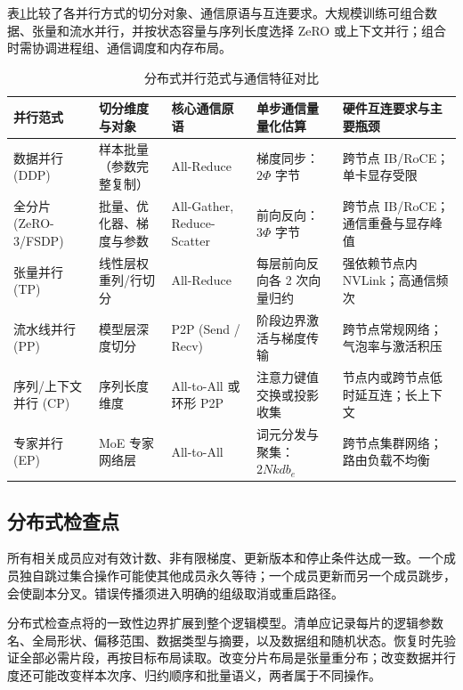 \documentclass[../textbook.tex]{subfiles}
\begin{document}
表\ref{tab:distributed-paradigms}比较了各并行方式的切分对象、通信原语与互连要求。大规模训练可组合数据、张量和流水并行，并按状态容量与序列长度选择 ZeRO 或上下文并行；组合时需协调进程组、通信调度和内存布局。

\begin{table}[htbp]
\centering
\caption{分布式并行范式与通信特征对比}\label{tab:distributed-paradigms}
\begin{tabularx}{\linewidth}{@{}lXXXX@{}}
\toprule
并行范式 & 切分维度与对象 & 核心通信原语 & 单步通信量量化估算 & 硬件互连要求与主要瓶颈 \\
\midrule
数据并行 (DDP) & 样本批量（参数完整复制） & All-Reduce & 梯度同步：$2\Phi$ 字节 & 跨节点 IB/RoCE；单卡显存受限 \\
全分片 (ZeRO-3/FSDP) & 批量、优化器、梯度与参数 & All-Gather, Reduce-Scatter & 前向反向：$3\Phi$ 字节 & 跨节点 IB/RoCE；通信重叠与显存峰值 \\
张量并行 (TP) & 线性层权重列/行切分 & All-Reduce & 每层前向反向各 2 次向量归约 & 强依赖节点内 NVLink；高通信频次 \\
流水线并行 (PP) & 模型层深度切分 & P2P (Send / Recv) & 阶段边界激活与梯度传输 & 跨节点常规网络；气泡率与激活积压 \\
序列/上下文并行 (CP) & 序列长度维度 & All-to-All 或环形 P2P & 注意力键值交换或投影收集 & 节点内或跨节点低时延互连；长上下文 \\
专家并行 (EP) & MoE 专家网络层 & All-to-All & 词元分发与聚集：$2Nkdb_e$ & 跨节点集群网络；路由负载不均衡 \\
\bottomrule
\end{tabularx}
\end{table}

\subsection{分布式检查点}
所有相关成员应对有效计数、非有限梯度、更新版本和停止条件达成一致。一个成员独自跳过集合操作可能使其他成员永久等待；一个成员更新而另一个成员跳步，会使副本分叉。错误传播须进入明确的组级取消或重启路径。

分布式检查点将的一致性边界扩展到整个逻辑模型。清单应记录每片的逻辑参数名、全局形状、偏移范围、数据类型与摘要，以及数据组和随机状态。恢复时先验证全部必需片段，再按目标布局读取。改变分片布局是张量重分布；改变数据并行度还可能改变样本次序、归约顺序和批量语义，两者属于不同操作。
\end{document}

